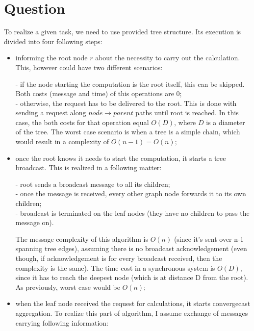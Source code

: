 \documentclass[paper=a4, fontsize=11pt]{scrartcl} %
\numberwithin{equation}{section} %
\numberwithin{figure}{section} %
\numberwithin{table}{section} %
\begin{document}

\section{Question}

To realize a given task, we need to use provided tree structure. Its execution is divided into four following steps:
\begin{itemize}
\item informing the root node $r$ about the necessity to carry out the calculation. This, however could have two different scenarios:

- if the node starting the computation is the root itself, this can be skipped. Both costs (message and time) of this operations are 0;\\
- otherwise, the request has to be delivered to the root. This is done with sending a request along $node \rightarrow parent$ paths until root is reached. In this case, the both costs for that operation equal $O(D)$, where $D$ is a diameter of the tree. The worst case scenario is when a tree is a simple chain, which would result in a complexity of $O(n-1)=O(n)$;
\item once the root knows it needs to start the computation, it starts a tree broadcast. This is realized in a following matter: 

- root sends a broadcast message to all its children;\\
- once the message is received, every other graph node forwards it to its own children;\\
- broadcast is terminated on the leaf nodes (they have no children to pass the message on).

The message complexity of this algorithm is $O(n)$ (since it's sent over n-1 spanning tree edges), assuming there is no broadcast acknowledgement (even though, if acknowledgement is for every broadcast received, then the complexity is the same). The time cost in a synchronous system is $O(D)$, since it has to reach the deepest node (which is at distance D from the root). As previously, worst case would be $O(n)$;

\item when the leaf node received the request for calculations, it starts convergecast aggregation. To realize this part of algorithm, I assume exchange of messages carrying following information:


\end{itemize}
\end{document}
